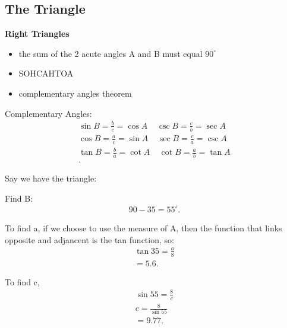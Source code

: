 \documentclass{report}
\begin{document}
    \pagebreak \bigbreak \noindent
    \subsection{The Triangle}

    \bigbreak \noindent \bigbreak \noindent 
    \begin{large}
      \textbf{Right Triangles}
    \end{large}
    \begin{itemize}
      \item the sum of the 2 acute angles A and B must equal $90^{\circ}$
      \item SOHCAHTOA
      \item complementary angles theorem
    \end{itemize}
    \bigbreak \noindent \bigbreak \noindent
    Complementary Angles:
    \begin{align*}
        \sin{B} = \frac{b}{c} = \cos{A}\ \ \ \ \ \csc{B} = \frac{c}{b} = \sec{A} \\
        \cos{B} = \frac{a}{c} = \sin{A}\ \ \ \ \ \sec{B} = \frac{c}{a} = \csc{A} \\
        \tan{B} = \frac{b}{a} = \cot{A}\ \ \ \ \ \cot{B} = \frac{a}{b} = \tan{A} \\
    .\end{align*}

    \bigbreak \noindent \bigbreak \noindent
    Say we have the triangle:

    \begin{figure}[ht]
        \centering
        \label{fig:tri}
    \end{figure}

  \bigbreak \noindent \bigbreak \noindent
  Find B:
  \begin{align*}
    90-35 = 55^{\circ}
  .\end{align*}

  \bigbreak \noindent \bigbreak \noindent
  To find a, if we choose to use the measure  of A, then the function that links opposite and adjancent is the tan function, so:
  \begin{align*}
    \tan{35} = \frac{a}{8} \\
    = 5.6
  .\end{align*}

  \bigbreak \noindent \bigbreak \noindent
  To find c,
  \begin{align*}
   \sin{55} = \frac{8}{c} \\
   c = \frac{8}{\sin{55}} \\
   = 9.77
  .\end{align*}
\end{document}
